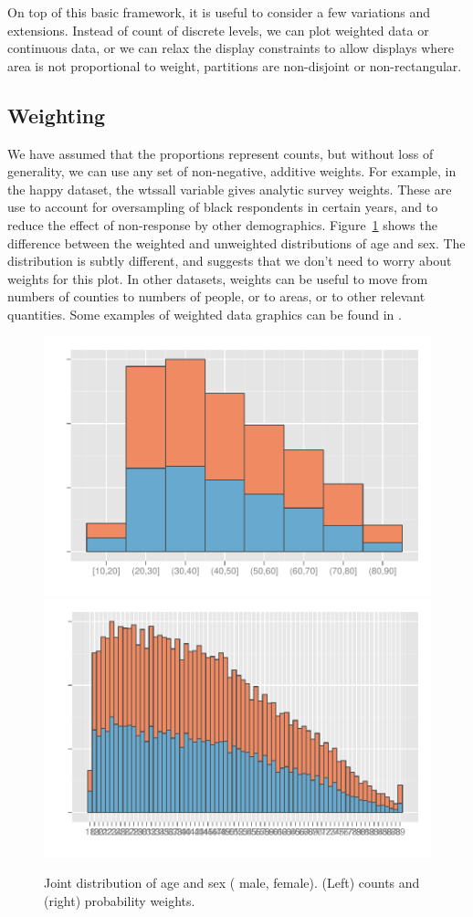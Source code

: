 \documentclass[journal]{vgtc}
\newcommand{\key}[1]
  {\protect \tikz{\fill[#1] rectangle (1ex,1ex);}}
\begin{document}
On top of this basic framework, it is useful to consider a few variations and extensions. Instead of count of discrete levels, we can plot weighted data or continuous data, or we can relax the display constraints to allow displays where area is not proportional to weight, partitions are non-disjoint or non-rectangular.

\subsection{Weighting}
\label{sub:weighting}

We have assumed that the proportions represent counts, but without loss of generality, we can use any set of non-negative, additive weights. For example, in the happy dataset, the {\sf wtssall} variable gives analytic survey weights. These are use to account for oversampling of black respondents in certain years, and to reduce the effect of non-response by other demographics. Figure~\ref{fig:weighting} shows the difference between the weighted and unweighted distributions of age and sex. The distribution is subtly different, and suggests that we don't need to worry about weights for this plot. In other datasets, weights can be useful to move from numbers of counties to numbers of people, or to areas, or to other relevant quantities. Some examples of weighted data graphics can be found in \citep{unwin:1998,unwin:2003aa,unwin:2006}.

\begin{figure}[htbp]
  \centering
    \includegraphics[width=0.5\linewidth]{wt-count}%
    \includegraphics[width=0.5\linewidth]{wt-wtssall}%
  \caption{Joint distribution of age and sex (\key{male} male, \key{female} female). (Left) counts and (right) probability weights.}
  \label{fig:weighting}
\end{figure}
\end{document}
